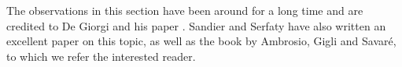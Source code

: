 The observations in this section have been around for a long time and are 
credited 
to De Giorgi and his paper 
\cite{de_giorgi_new_problems_on_minimizing_movements}. Sandier and Serfaty have 
also written an excellent paper 
\cite{sandler_serfaty_gamme_convergence_of_gf_with_applications_to_gl} on this 
topic, as well as the book 
\cite{ambrosio_gigli_savare_gradient_flows_in_metric_spaces_and_in_the_space_of_prob_measures}
by Ambrosio, Gigli and 
Savaré,
to which we refer the 
interested reader.